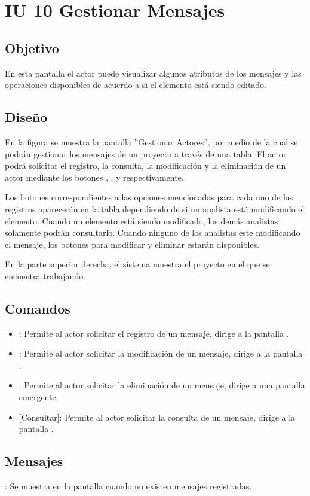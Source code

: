 \section{IU 10 Gestionar Mensajes}

\subsection{Objetivo}
	En esta pantalla el actor puede visualizar algunos atributos de los mensajes y las operaciones disponibles de acuerdo a si el elemento está siendo editado.
\subsection{Diseño}
	En la figura  se muestra la pantalla ''Gestionar Actores'', por medio de la cual se podrán gestionar los mensajes de un proyecto a través de una tabla. El actor podrá solicitar el registro, la consulta, la modificación y la eliminación de un actor mediante los botones , , \editar y \eliminar respectivamente.
	
	Los botones correspondientes a las opciones mencionadas para cada uno de los registros aparecerán en la tabla dependiendo de si un analista está modificando el elemento. Cuando un elemento está siendo modificado, los demás analistas solamente podrán consultarlo. Cuando ninguno de los analistas este modificando el mensaje, los botones para modificar y eliminar
	estarán disponibles.
	
	En la parte superior derecha, el sistema muestra el proyecto en el que se encuentra trabajando.

\subsection{Comandos}
\begin{itemize}
	\item {}: Permite al actor solicitar el registro de un mensaje, dirige a la pantalla .
	\item \editar [Modificar]: Permite al actor solicitar la modificación de un mensaje, dirige a la pantalla .
	\item \eliminar [Eliminar]: Permite al actor solicitar la eliminación de un mensaje, dirige a una pantalla emergente.
	\item {} [Consultar]: Permite al actor solicitar la consulta de un mensaje, dirige a la pantalla  .
\end{itemize}
\subsection{Mensajes}

\begin{Citemize}
	\item {}: Se muestra en la pantalla  cuando no existen mensajes registradas.
\end{Citemize}
